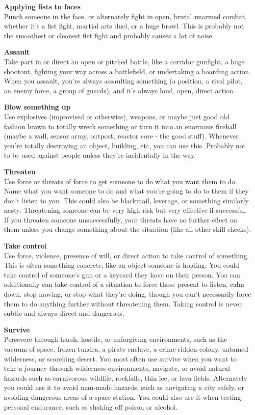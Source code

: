 \textbf{Applying fists to faces}\\ 
Punch someone in the face, or alternately fight in open, brutal unarmed combat, whether it's a fist fight, martial arts duel, or a huge brawl. This is probably not the smoothest or cleanest fist fight and probably causes a lot of noise.

\textbf{Assault}\\
Take part in or direct an open or pitched battle, like a corridor gunfight, a huge shootout, fighting your way across a battlefield, or undertaking a boarding action. When you assault, you're always assaulting something (a position, a rival pilot, an enemy force, a group of guards), and it's always loud, open, direct action.

\textbf{Blow something up}\\
Use explosives (improvised or otherwise), weapons, or maybe just good old fashion brawn to totally wreck something or turn it into an enormous fireball (maybe a wall, sensor array, outpost, reactor core - the good stuff). Whenever you're totally destroying an object, building, etc, you can use this. Probably not to be used against people unless they're incidentally in the way.

\textbf{Threaten}\\
Use force or threats of force to get someone to do what you want them to do. Name what you want someone to do and what you're going to do to them if they don't listen to you. This could also be blackmail, leverage, or something similarly nasty. Threatening someone can be very high risk but very effective if successful. If you threaten someone unsuccessfully, your threats have no further effect on them unless you change something about the situation (like all other skill checks).

\textbf{Take control}\\
Use force, violence, presence of will, or direct action to take control of something. This is often something concrete, like an object someone is holding. You could take control of someone's gun or a keycard they have on their person. You can additionally can take control of a situation to force those present to listen, calm down, stop moving, or stop what they're doing, though you can't necessarily force them to do anything further without threatening them. Taking control is never subtle and always direct and dangerous.

\textbf{Survive}\\
Persevere through harsh, hostile, or unforgiving environments, such as the vacuum of space, frozen tundra, a pirate enclave, a crime-ridden colony, untamed wilderness, or scorching desert. You most often use survive when you want to take a journey through wilderness environments, navigate, or avoid natural hazards such as carnivorous wildlife, rockfalls, thin ice, or lava fields. Alternately you could use it to avoid man-made hazards, such as navigating a city safely, or avoiding dangerous areas of a space station. You could also use it when testing personal endurance, such as shaking off poison or alcohol.


